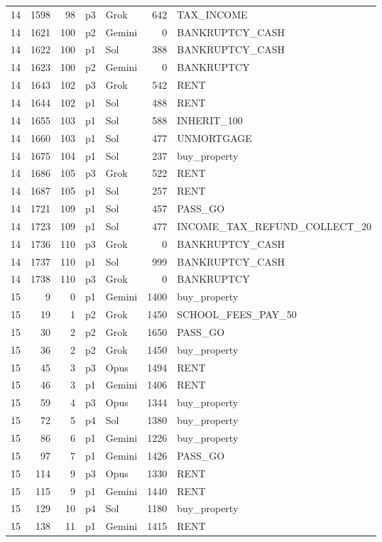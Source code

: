 \begin{longtable}{r r r l l r L{2.2in}}
14 & 1598 & 98 & p3 & Grok & 642 & TAX\_INCOME \\
14 & 1621 & 100 & p2 & Gemini & 0 & BANKRUPTCY\_CASH \\
14 & 1622 & 100 & p1 & Sol & 388 & BANKRUPTCY\_CASH \\
14 & 1623 & 100 & p2 & Gemini & 0 & BANKRUPTCY \\
14 & 1643 & 102 & p3 & Grok & 542 & RENT \\
14 & 1644 & 102 & p1 & Sol & 488 & RENT \\
14 & 1655 & 103 & p1 & Sol & 588 & INHERIT\_100 \\
14 & 1660 & 103 & p1 & Sol & 477 & UNMORTGAGE \\
14 & 1675 & 104 & p1 & Sol & 237 & buy\_property \\
14 & 1686 & 105 & p3 & Grok & 522 & RENT \\
14 & 1687 & 105 & p1 & Sol & 257 & RENT \\
14 & 1721 & 109 & p1 & Sol & 457 & PASS\_GO \\
14 & 1723 & 109 & p1 & Sol & 477 & INCOME\_TAX\_REFUND\_COLLECT\_20 \\
14 & 1736 & 110 & p3 & Grok & 0 & BANKRUPTCY\_CASH \\
14 & 1737 & 110 & p1 & Sol & 999 & BANKRUPTCY\_CASH \\
14 & 1738 & 110 & p3 & Grok & 0 & BANKRUPTCY \\
15 & 9 & 0 & p1 & Gemini & 1400 & buy\_property \\
15 & 19 & 1 & p2 & Grok & 1450 & SCHOOL\_FEES\_PAY\_50 \\
15 & 30 & 2 & p2 & Grok & 1650 & PASS\_GO \\
15 & 36 & 2 & p2 & Grok & 1450 & buy\_property \\
15 & 45 & 3 & p3 & Opus & 1494 & RENT \\
15 & 46 & 3 & p1 & Gemini & 1406 & RENT \\
15 & 59 & 4 & p3 & Opus & 1344 & buy\_property \\
15 & 72 & 5 & p4 & Sol & 1380 & buy\_property \\
15 & 86 & 6 & p1 & Gemini & 1226 & buy\_property \\
15 & 97 & 7 & p1 & Gemini & 1426 & PASS\_GO \\
15 & 114 & 9 & p3 & Opus & 1330 & RENT \\
15 & 115 & 9 & p1 & Gemini & 1440 & RENT \\
15 & 129 & 10 & p4 & Sol & 1180 & buy\_property \\
15 & 138 & 11 & p1 & Gemini & 1415 & RENT \\

\end{longtable}
